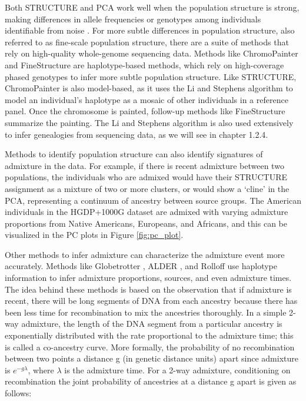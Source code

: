 Both STRUCTURE and PCA work well when the population structure is strong, making differences in allele frequencies or genotypes among individuals identifiable from noise \cite{Patterson2006}. For more subtle differences in population structure, also referred to as fine-scale population structure, there are a suite of methods that rely on high-quality whole-genome sequencing data. Methods like ChromoPainter and FineStructure \cite{Lawson2012} are haplotype-based methods, which rely on high-coverage phased genotypes to infer more subtle population structure. Like STRUCTURE, ChromoPainter is also model-based, as it uses the Li and Stephens \cite{Li2003} algorithm to model an individual's haplotype as a mosaic of other individuals in a reference panel. Once the chromosome is painted, follow-up methods like FineStructure summarize the painting. The Li and Stephens algorithm is also used extensively to infer genealogies from sequencing data, as we will see in chapter 1.2.4.

Methods to identify population structure can also identify signatures of admixture in the data. For example, if there is recent admixture between two populations, the individuals who are admixed would have their STRUCTURE assignment as a mixture of two or more clusters, or would show a `cline' in the PCA, representing a continuum of ancestry between source groups. The American individuals in the HGDP+1000G dataset are admixed with varying admixture proportions from Native Americans, Europeans, and Africans, and this can be visualized in the PC plots in Figure \ref{fig:pc_plot}.

Other methods to infer admixture can characterize the admixture event more accurately. Methods like Globetrotter \cite{hellenthal2014genetic}, ALDER \cite{loh2013inferring}, and Rolloff \cite{moorjani2011history, patterson2012ancient} use haplotype information to infer admixture proportions, sources, and even admixture times. The idea behind these methods is based on the observation that if admixture is recent, there will be long segments of DNA from each ancestry because there has been less time for recombination to mix the ancestries thoroughly. In a simple 2-way admixture, the length of the DNA segment from a particular ancestry is exponentially distributed with the rate proportional to the admixture time; this is called a co-ancestry curve. More formally, the probability of no recombination between two points a distance g (in genetic distance units) apart since admixture is $e^{-g\lambda}$, where $\lambda$ is the admixture time. For a 2-way admixture, conditioning on recombination the joint probability of ancestries at a distance g apart is given as follows:

